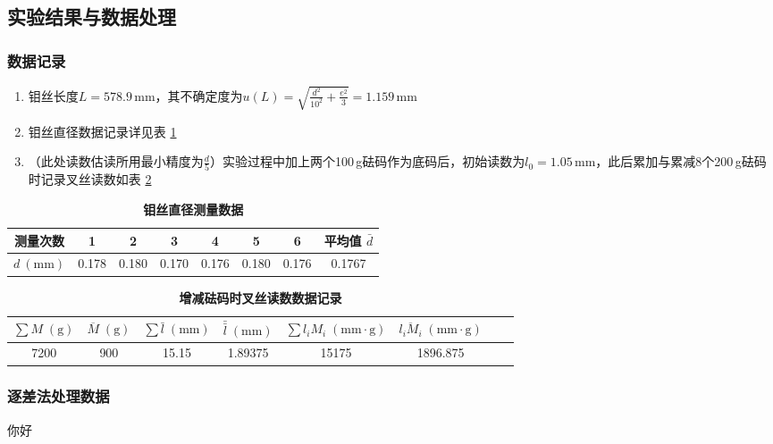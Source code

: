 \documentclass[zihao=5, UTF8]{article}
\theoremstyle{MyLineTheoremStyle} %
\theoremstyle{MyBlockTheoremStyle} %
\theoremstyle{MySubsubsectionStyle} %
\begin{document}
\subsection{实验结果与数据处理}

\subsubsection{数据记录}

\begin{enumerate}
    \item 钼丝长度$ L=578.9\,\mathrm{mm} $，其不确定度为$ u(L)=\sqrt{\frac{d^2}{10^2}+\frac{e^2}{3}}=1.159\,\mathrm{mm} $
    \item 钼丝直径数据记录详见表 \ref{钼丝直径测量数据}
    \item （此处读数估读所用最小精度为$ \frac d5 $）实验过程中加上两个100\,g砝码作为底码后，初始读数为$ l_0=1.05\,\mathrm{mm} $，此后累加与累减8个200\,g砝码时记录叉丝读数如表 \ref{增减砝码时叉丝读数数据记录}
\end{enumerate}

\begin{table}[H]
    \centering
    \caption{\textbf{钼丝直径测量数据}}
    \label{钼丝直径测量数据}
    \begin{tabular}{cccccccc}
    \toprule
    测量次数 &1&2&3&4&5&6& 平均值 $\bar{d}$ \\
    \midrule
    $d\ (\mathrm{mm})$ &0.178&0.180&0.170&0.176&0.180&0.176&0.1767\\ 
    \bottomrule
    \end{tabular}
\end{table}

\begin{table}[H]
    \centering
    \caption{\textbf{增减砝码时叉丝读数数据记录}}
    \label{增减砝码时叉丝读数数据记录}
    \begin{tabular}{cccccccc}
    \toprule
    $ \sum M\;(\mathrm g) $&$ \overline M\;(\mathrm g) $&$ \sum\bar l\;(\mathrm{mm}) $&$ \bar{\bar l}\;(\mathrm{mm}) $&$ \sum l_iM_i\;(\mathrm{mm\cdot g}) $&$ \overline{l_iM_i}\;(\mathrm{mm\cdot g}) $\\
    \midrule
    7200&900&15.15&1.89375&15175&1896.875\\ 
    \bottomrule
    \end{tabular}
\end{table}

\subsubsection{逐差法处理数据}
你好
\end{document}
